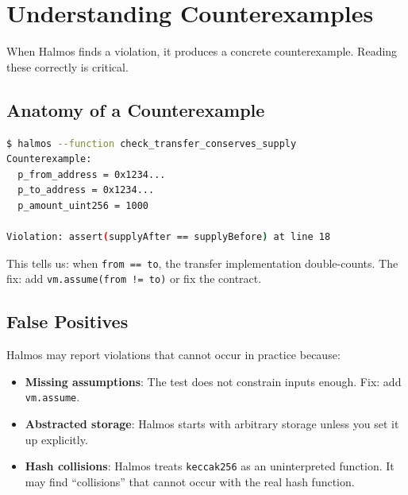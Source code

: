 \section{Understanding Counterexamples}


When Halmos finds a violation, it produces a concrete counterexample. Reading these
correctly is critical.

\subsection{Anatomy of a Counterexample}

\begin{lstlisting}[language=bash,caption={Halmos counterexample output}]
$ halmos --function check_transfer_conserves_supply
Counterexample:
  p_from_address = 0x1234...
  p_to_address = 0x1234...
  p_amount_uint256 = 1000

Violation: assert(supplyAfter == supplyBefore) at line 18
\end{lstlisting}

This tells us: when \texttt{from == to}, the transfer implementation double-counts.
The fix: add \texttt{vm.assume(from != to)} or fix the contract.

\subsection{False Positives}

Halmos may report violations that cannot occur in practice because:
\begin{itemize}[nosep]
  \item \textbf{Missing assumptions}: The test does not constrain inputs enough. Fix: add
    \texttt{vm.assume}.
  \item \textbf{Abstracted storage}: Halmos starts with arbitrary storage unless you set
    it up explicitly.
  \item \textbf{Hash collisions}: Halmos treats \texttt{keccak256} as an uninterpreted
    function. It may find ``collisions'' that cannot occur with the real hash function.
\end{itemize}

